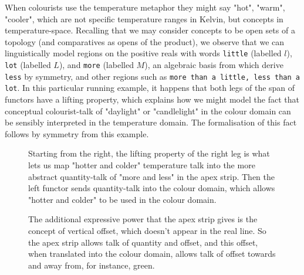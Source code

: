 \begin{example}
When colourists use the temperature metaphor they might say "hot", "warm", "cooler", which are not specific temperature ranges in Kelvin, but concepts in temperature-space. Recalling that we may consider concepts to be open sets of a topology (and comparatives as opens of the product), we observe that we can linguistically model regions on the positive reals with words \texttt{little} (labelled $l$), \texttt{lot} (labelled $L$), and \texttt{more} (labelled $M$), an algebraic basis from which derive \texttt{less} by symmetry, and other regions such as \texttt{more than a little, less than a lot}. In this particular running example, it happens that both legs of the span of functors have a lifting property, which explains how we might model the fact that conceptual colourist-talk of "daylight" or "candlelight" in the colour domain can be sensibly interpreted in the temperature domain. The formalisation of this fact follows by symmetry from this example.
\begin{figure}[h]
\centering
{}
\caption{Starting from the right, the lifting property of the right leg is what lets us map "hotter and colder" temperature talk into the more abstract quantity-talk of "more and less" in the apex strip. Then the left functor sends quantity-talk into the colour domain, which allows "hotter and colder" to be used in the colour domain.}
\end{figure}
\begin{figure}[h]
\centering
{}
\caption{The additional expressive power that the apex strip gives is the concept of vertical offset, which doesn't appear in the real line. So the apex strip allows talk of quantity and offset, and this offset, when translated into the colour domain, allows talk of offset towards and away from, for instance, green.}
\end{figure}
\end{example}
\clearpage

